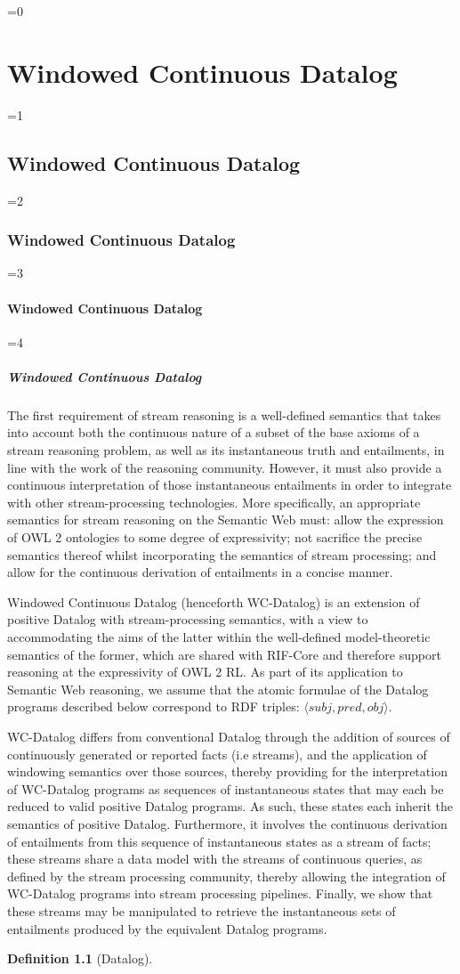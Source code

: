 \documentclass[twocolumn,preprint,3p,number]{elsarticle}
\theoremstyle{plain}
\theoremstyle{definition}
\newtheorem{definition}{Definition}
\newcounter{nestingdepth}
\newenvironment{nestedsection}[2]{
  \ifnum\value{nestingdepth}=0
    \chapter{#1}
  \else
    \ifnum\value{nestingdepth}=1
      \section{#1}
    \else
      \ifnum\value{nestingdepth}=2
        \subsection{#1}
      \else
        \ifnum\value{nestingdepth}=3
          \subsubsection{#1}
        \else
          \ifnum\value{nestingdepth}=4
            \paragraph{#1}
          \else
            \PackageError{nestedsections}{Maximum nesting level exceeded!}{uh oh!}
          \fi
        \fi
      \fi
    \fi
  \fi
  \addtocounter{nestingdepth}{1}
  \label{sec:#2}
}{\addtocounter{nestingdepth}{-1}}
\def\labeldef#1{\label{def:#1}}
\begin{document}
\begin{nestedsection}{Windowed Continuous Datalog}{semantics}
The first requirement of stream reasoning is a well-defined semantics
that takes into account both the continuous nature of a subset of the
base axioms of a stream reasoning problem, as well as its
instantaneous truth and entailments, in line with the work of the
reasoning community.  However, it must also provide a continuous
interpretation of those instantaneous entailments in order to
integrate with other stream-processing technologies.  More
specifically, an appropriate semantics for stream reasoning on the
Semantic Web must: allow the expression of OWL 2 ontologies to some
degree of expressivity; not sacrifice the precise semantics thereof
whilst incorporating the semantics of stream processing; and allow for
the continuous derivation of entailments in a concise manner.

Windowed Continuous Datalog (henceforth WC-Datalog) is an extension of positive
Datalog with stream-processing semantics, with a view to accommodating
the aims of the latter within the well-defined model-theoretic
semantics of the former, which are shared with RIF-Core
\cite{w3crifbld} and therefore support reasoning at the expressivity
of OWL 2 RL. As part of its application to Semantic Web reasoning, we
assume that the atomic formulae of the Datalog programs described
below correspond to RDF triples: $\langle subj, pred, obj\rangle$.

WC-Datalog differs from conventional Datalog through the addition of
sources of continuously generated or reported facts (i.e streams), and
the application of windowing semantics over those sources,
thereby providing for the interpretation of WC-Datalog programs as
sequences of instantaneous states that may each be reduced to valid positive Datalog
programs.  As such, these states each inherit the semantics of
positive Datalog.  Furthermore, it involves the continuous derivation
of entailments from this sequence of instantaneous states as a stream
of facts; these streams share a data model with the streams of
continuous queries, as defined by the stream processing community,
thereby allowing the integration of WC-Datalog programs into stream
processing pipelines. Finally, we show that these streams may be
manipulated to retrieve the instantaneous sets of entailments produced
by the equivalent Datalog programs.

\begin{definition}[Datalog]
\labeldef{continuous datalog: datalog program}


\end{definition}
\end{nestedsection}
\end{document}
